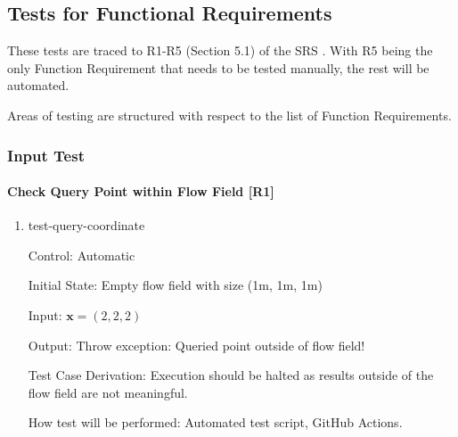 \documentclass[12pt, titlepage]{article}
\begin{document}
\subsection{Tests for Functional Requirements} \label{FuncTest}

These tests are traced to R1-R5 (Section 5.1) of the SRS \citet{SRS}. With R5 being the only Function Requirement that needs to be tested manually, the rest will be automated. 

Areas of testing are structured with respect to the list of Function Requirements.



\subsubsection{Input Test} \label{InputTest}


		
\paragraph{Check Query Point within Flow Field [R1]}

\begin{enumerate}

\item{test-query-coordinate\\}

Control: Automatic
					
Initial State: Empty flow field with size (1m, 1m, 1m)
					
Input: $\mathbf{x}=(2,2,2)$
					
Output: Throw exception: Queried point outside of flow field!

Test Case Derivation: Execution should be halted as results outside of the flow field are not meaningful.
					
How test will be performed: Automated test script, GitHub Actions.

\end{enumerate}
\end{document}
